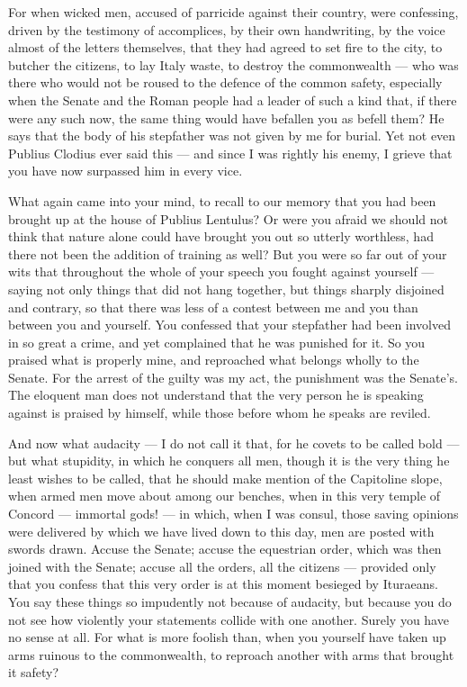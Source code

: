  For when wicked men, accused of parricide against their country, were confessing, driven by the testimony of accomplices, by their own handwriting, by the voice almost of the letters themselves, that they had agreed to set fire to the city, to butcher the citizens, to lay Italy waste, to destroy the commonwealth --- who was there who would not be roused to the defence of the common safety, especially when the Senate and the Roman people had a leader of such a kind that, if there were any such now, the same thing would have befallen you as befell them? He says that the body of his stepfather was not given by me for burial. Yet not even Publius Clodius ever said this --- and since I was rightly his enemy, I grieve that you have now surpassed him in every vice.

 What again came into your mind, to recall to our memory that you had been brought up at the house of Publius Lentulus? Or were you afraid we should not think that nature alone could have brought you out so utterly worthless, had there not been the addition of training as well? But you were so far out of your wits that throughout the whole of your speech you fought against yourself --- saying not only things that did not hang together, but things sharply disjoined and contrary, so that there was less of a contest between me and you than between you and yourself. You confessed that your stepfather had been involved in so great a crime, and yet complained that he was punished for it. So you praised what is properly mine, and reproached what belongs wholly to the Senate. For the arrest of the guilty was my act, the punishment was the Senate's. The eloquent man does not understand that the very person he is speaking against is praised by himself, while those before whom he speaks are reviled.

 And now what audacity --- I do not call it that, for he covets to be called bold --- but what stupidity, in which he conquers all men, though it is the very thing he least wishes to be called, that he should make mention of the Capitoline slope, when armed men move about among our benches, when in this very temple of Concord --- immortal gods! --- in which, when I was consul, those saving opinions were delivered by which we have lived down to this day, men are posted with swords drawn. Accuse the Senate; accuse the equestrian order, which was then joined with the Senate; accuse all the orders, all the citizens --- provided only that you confess that this very order is at this moment besieged by Ituraeans. You say these things so impudently not because of audacity, but because you do not see how violently your statements collide with one another. Surely you have no sense at all. For what is more foolish than, when you yourself have taken up arms ruinous to the commonwealth, to reproach another with arms that brought it safety?

